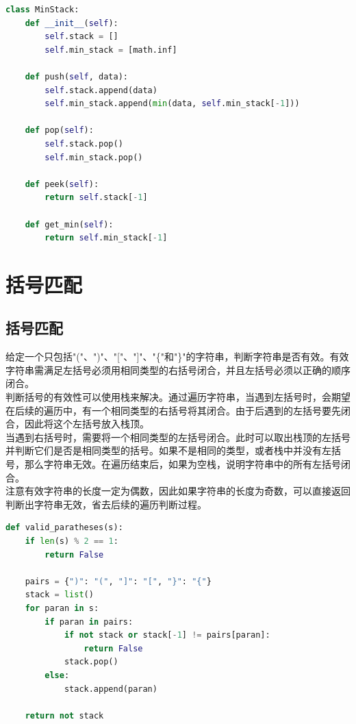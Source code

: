 
\begin{lstlisting}[language=Python]
class MinStack:
    def __init__(self):
        self.stack = []
        self.min_stack = [math.inf]
    
    def push(self, data):
        self.stack.append(data)
        self.min_stack.append(min(data, self.min_stack[-1]))
    
    def pop(self):
        self.stack.pop()
        self.min_stack.pop()
    
    def peek(self):
        return self.stack[-1]
    
    def get_min(self):
        return self.min_stack[-1]
\end{lstlisting}

\newpage

\section{括号匹配}

\subsection{括号匹配}

给定一个只包括"("、")"、"["、"]"、"\{"和"\}"的字符串，判断字符串是否有效。有效字符串需满足左括号必须用相同类型的右括号闭合，并且左括号必须以正确的顺序闭合。 \\

判断括号的有效性可以使用栈来解决。通过遍历字符串，当遇到左括号时，会期望在后续的遍历中，有一个相同类型的右括号将其闭合。由于后遇到的左括号要先闭合，因此将这个左括号放入栈顶。 \\

当遇到右括号时，需要将一个相同类型的左括号闭合。此时可以取出栈顶的左括号并判断它们是否是相同类型的括号。如果不是相同的类型，或者栈中并没有左括号，那么字符串无效。在遍历结束后，如果为空栈，说明字符串中的所有左括号闭合。 \\

注意有效字符串的长度一定为偶数，因此如果字符串的长度为奇数，可以直接返回判断出字符串无效，省去后续的遍历判断过程。 \\


\begin{lstlisting}[language=Python]
def valid_paratheses(s):
    if len(s) % 2 == 1:
        return False
    
    pairs = {")": "(", "]": "[", "}": "{"}
    stack = list()
    for paran in s:
        if paran in pairs:
            if not stack or stack[-1] != pairs[paran]:
                return False
            stack.pop()
        else:
            stack.append(paran)

    return not stack
\end{lstlisting}

